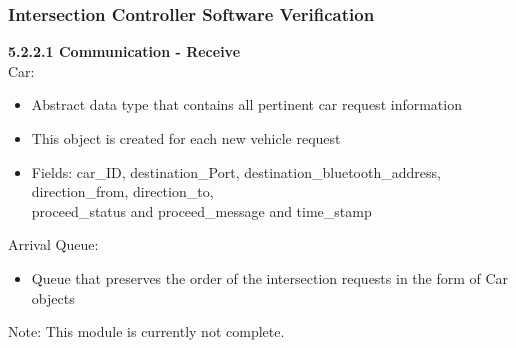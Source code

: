 \documentclass [10pt]{article}
\begin{document}
        





\subsubsection{Intersection Controller Software Verification} 

\textbf{5.2.2.1 Communication - Receive}\\ 
Car:
\begin{itemize}[topsep=0pt]
    \itemsep -3pt
    \item Abstract data type that contains all pertinent car request information
    \item This object is created for each new vehicle request
    \item Fields:  car\_ID, destination\_Port, destination\_bluetooth\_address, direction\_from, direction\_to,\\ proceed\_status and proceed\_message and time\_stamp
\end{itemize}

Arrival Queue:
\begin{itemize}[topsep=0pt]
    \itemsep -3pt
    \item Queue that preserves the order of the intersection requests in the form of Car objects \\
\end{itemize}

    Note: This module is currently not complete.\\
    
\end{document}
